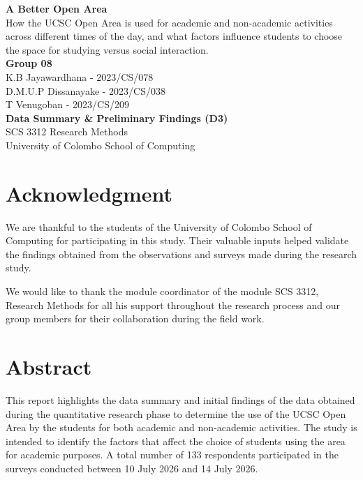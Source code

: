 \documentclass[12pt, a4paper]{report}
\begin{document}

\begin{titlepage}
    \centering
    \vspace*{2cm}
    \Huge\textbf{A Better Open Area}\\
    \vspace{0.5cm}
    \Large How the UCSC Open Area is used for academic and
non-academic activities across different times of the day,
and what factors influence students to choose the space
for studying versus social interaction.\\
    \vspace{6.5cm}
    \textbf{Group 08}\\
    K.B Jayawardhana - 2023/CS/078\\
    D.M.U.P Dissanayake - 2023/CS/038\\
    T Venugoban - 2023/CS/209\\
    \vspace{2cm}
    \Large \textbf{Data Summary \& Preliminary Findings (D3)}\\
    \vspace{2cm}
    SCS 3312 Research Methods\\
    \vspace{0.25cm}
    \small University of Colombo School of Computing\\
    \vfill
\end{titlepage}

\chapter*{Acknowledgment}
We are thankful to the students of the University of Colombo School of Computing for participating in this study. Their valuable inputs helped validate 
the findings obtained from the observations and surveys made during the research study.

We would like to thank the module coordinator of the module SCS 3312, Research Methods for all his support throughout the research process and our group members for their collaboration during the field work.

\chapter*{Abstract}
This report highlights the data summary and initial findings of the data obtained during the quantitative research phase to determine the use of the UCSC Open Area by the students for both academic and non-academic activities. The study is intended to identify the factors that affect the choice of students using the area for academic purposes. A total number of 133 respondents participated in the surveys conducted between 10 July 2026 and 14 July 2026.
\end{document}
